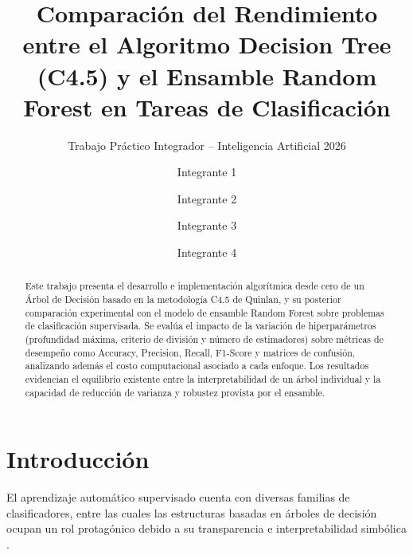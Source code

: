 \documentclass[runningheads]{llncs}
\begin{document}
\title{Comparación del Rendimiento entre el Algoritmo Decision Tree (C4.5) y el Ensamble Random Forest en Tareas de Clasificación}
\subtitle{Trabajo Práctico Integrador -- Inteligencia Artificial 2026}


\author{Integrante 1 \and Integrante 2 \and Integrante 3 \and Integrante 4}


\maketitle

\begin{abstract}
Este trabajo presenta el desarrollo e implementación algorítmica desde cero de un Árbol de Decisión basado en la metodología C4.5 de Quinlan, y su posterior comparación experimental con el modelo de ensamble Random Forest sobre problemas de clasificación supervisada. Se evalúa el impacto de la variación de hiperparámetros (profundidad máxima, criterio de división y número de estimadores) sobre métricas de desempeño como Accuracy, Precision, Recall, F1-Score y matrices de confusión, analizando además el costo computacional asociado a cada enfoque. Los resultados evidencian el equilibrio existente entre la interpretabilidad de un árbol individual y la capacidad de reducción de varianza y robustez provista por el ensamble.

\end{abstract}

\section{Introducción}
El aprendizaje automático supervisado cuenta con diversas familias de clasificadores, entre las cuales las estructuras basadas en árboles de decisión ocupan un rol protagónico debido a su transparencia e interpretabilidad simbólica \cite{liu2011web}.
\end{document}
